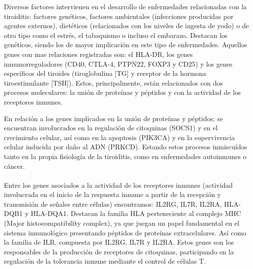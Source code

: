 Diversos factores  intervienen en el desarrollo de enfermedades relacionadas con la tiroiditis: factores genéticos, factores ambientales (infecciones producidas por agentes externos), dietéticos (relacionados con los niveles de ingesta de yodo) o de otro tipo como el estrés, el tabaquismo o incluso el embarazo. Destacan los genéticos, siendo los de mayor implicación en este tipo de enfermedades. \cite{Hiromatsu2013}
Aquellos genes con mas relaciones registradas son: el HLA-DR, los genes inmunorreguladores (CD40, CTLA-4, PTPN22, FOXP3 y CD25) y los genes específicos del tiroides (tiroglobulina [TG] y receptor de la hormona tiroestimulante [TSH]).
Estos, principalmente, están relacionados con dos procesos moleculares: la unión de proteínas y péptidos y con la actividad de los receptores inmunes. \cite{Hiromatsu2013, Ahmed2022}

En relación a los genes implicados en la unión de proteínas y péptidos; se encuentran involucrados en la regulación de citoquinas (SOCS1) y en el crecimiento celular, así como en la  apoptosis (PIK3CA) y en la supervivencia celular inducida por daño al ADN (PRKCD). Estando estos procesos inmiscuídos tanto en la propia fisiología de la tiroiditis, como en enfermedades autoinmunes o cáncer.\cite{Yamada2022, PRKCDGeneCards}
\\ \\ 
Entre los genes asociados a la actividad de los receptores inmunes (actividad involucrada en el inicio de la respuesta inmune a partir de la recepción y transmisión de señales entre células) encontramos: IL2RG, IL7R, IL2RA, HLA-DQB1 y HLA-DQA1. Destacan la familia HLA  perteneciente al complejo MHC (Major histocompatibility complex), ya que juegan un papel fundamental en el sistema inmunológico presentando péptidos de proteínas extracelulares. \cite{HLA}Así como la familia de ILR, compuesta por IL2RG, IL7R y IL2RA. Estos genes son los responsables de la producción de receptores de citoquinas, participando en la regulación de la tolerancia inmune mediante el control de células T. \cite{LvanParijs1998}



